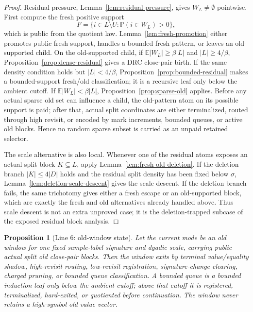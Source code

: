 \documentclass[11pt]{article}
\newtheorem{proposition}[theorem]{Proposition}
\theoremstyle{remark}
\newcommand{\E}{\mathbb E}
\newcommand{\Prob}{\mathbb P}
\begin{document}
\begin{proof}
Residual pressure, Lemma~\ref{lem:residual-pressure}, gives $W_L\ne\emptyset$ pointwise.  First compute the fresh positive support
\[
        F=\{i\in L\setminus U:\Prob(i\in W_L)>0\},
\]
which is public from the quotient law.  Lemma~\ref{lem:fresh-promotion} either promotes public fresh support, handles a bounded fresh pattern, or leaves an old-supported child.  On the old-supported child, if $\E|W_L|\ge\beta |L|$ and $|L|\ge4/\beta$, Proposition~\ref{prop:dense-residual} gives a DRC close-pair birth.  If the same density condition holds but $|L|<4/\beta$, Proposition~\ref{prop:bounded-residual} makes a bounded-support fresh/old classification; it is a recursive leaf only below the ambient cutoff.  If $\E|W_L|<\beta|L|$, Proposition~\ref{prop:sparse-old} applies.  Before any actual sparse old set can influence a child, the old-pattern atom on its possible support is paid; after that, actual split coordinates are either terminalized, routed through high revisit, or encoded by mark increments, bounded queues, or active old blocks.  Hence no random sparse subset is carried as an unpaid retained selector.

The scale alternative is also local.  Whenever one of the residual atoms
exposes an actual split block $K\subseteq L$, apply
Lemma~\ref{lem:fresh-old-deletion}.  If the deletion branch
$|K|\le4|D|$ holds and the residual split density has been fixed below
$\sigma$, Lemma~\ref{lem:deletion-scale-descent} gives the scale descent.  If
the deletion branch fails, the same trichotomy gives either a fresh escape or
an old-supported block, which are exactly the fresh and old alternatives
already handled above.  Thus scale descent is not an extra unproved case; it
is the deletion-trapped subcase of the exposed residual block analysis.
\end{proof}

\begin{proposition}[Line 6: old-window state]\label{prop:line-old-window}
Let the current mode be an old window for one fixed sample-label signature and dyadic scale, carrying public actual split old close-pair blocks.  Then the window exits by terminal value/equality shadow, high-revisit routing, low-revisit registration, signature-change clearing, charged pruning, or bounded queue classification.  A bounded queue is a bounded induction leaf only below the ambient cutoff; above that cutoff it is registered, terminalized, hard-exited, or quotiented before continuation.  The window never retains a high-symbol old value vector.
\end{proposition}
\end{document}
